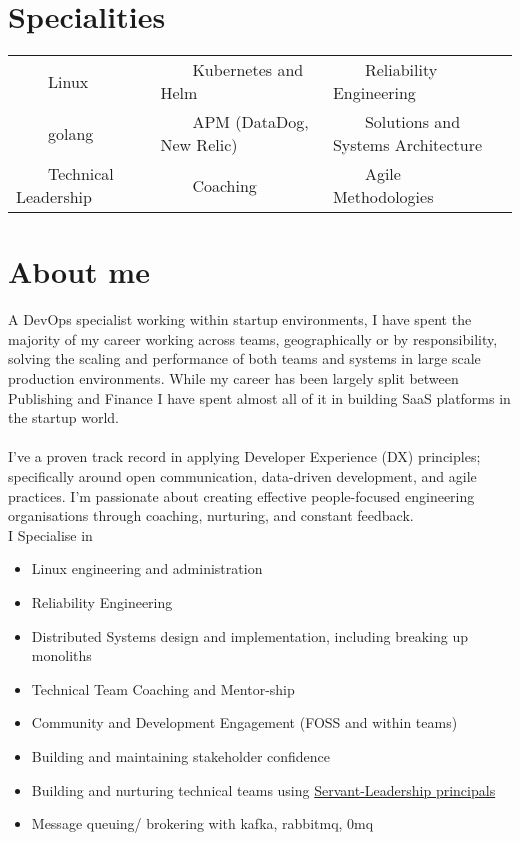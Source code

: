 \documentclass[11pt,a4paper,sans]{article}
\newcommand{\tabitem}{~~\llap{\textbullet}~~}
\begin{document}


\section{Specialities}
\begin{tabular}{lll}
  \tabitem Linux & \tabitem Kubernetes and Helm & \tabitem Reliability Engineering \\
  \tabitem golang & \tabitem APM (DataDog, New Relic) & \tabitem Solutions and Systems Architecture \\
  \tabitem Technical Leadership & \tabitem Coaching & \tabitem Agile Methodologies \\
\end{tabular}

\section{About me}
A DevOps specialist working within startup environments, I have spent the majority of my career working across teams, geographically or by responsibility, solving the scaling and performance of both teams and systems in large scale production environments. While my career has been largely split between Publishing and Finance I have spent almost all of it in building SaaS platforms in the startup world. \\
\\
I've a proven track record in applying Developer Experience (DX) principles; specifically around open communication, data-driven development, and agile practices. I'm passionate about creating effective people-focused engineering organisations through coaching, nurturing, and constant feedback.
\\
I Specialise in

\begin{itemize}
\item Linux engineering and administration
\item Reliability Engineering
\item Distributed Systems design and implementation, including breaking up monoliths
\item Technical Team Coaching and Mentor-ship
\item Community and Development Engagement (FOSS and within teams)
\item Building and maintaining stakeholder confidence
\item Building and nurturing technical teams using \href{https://www.mindtools.com/pages/article/servant-leadership.htm}{Servant-Leadership principals}
\item Message queuing/ brokering with kafka, rabbitmq, 0mq
\end{itemize}
\end{document}
